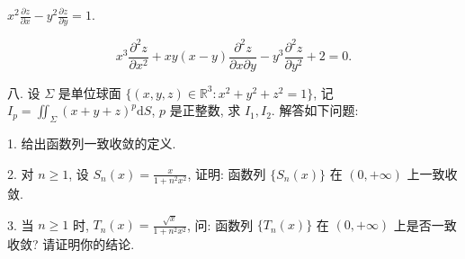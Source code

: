\documentclass{examcollection}
\renewcommand{\displayformula}[1]{\[#1\]}
\begin{document}
{\begin{minipage}{\textwidth}
$x^{2} \frac{\partial z}{\partial x} - y^{2} \frac{\partial z}{\partial y} = 1$.\par
\displayformula{x ^ {3} \frac {\partial^ {2} z}{\partial x ^ {2}} + x y (x - y) \frac {\partial^ {2} z}{\partial x \partial y} - y ^ {3} \frac {\partial^ {2} z}{\partial y ^ {2}} + 2 = 0.}\par
八. 设 $\Sigma$ 是单位球面 $\{(x, y, z) \in \mathbb{R}^3 : x^2 + y^2 + z^2 = 1\}$, 记 $I_p = \iint_{\Sigma} (x + y + z)^p \mathrm{d}S$, $p$ 是正整数, 求 $I_1, I_2$.
解答如下问题:\par
1. 给出函数列一致收敛的定义.\par
2. 对 $n \geq 1$, 设 $S_{n}(x) = \frac{x}{1 + n^{2}x^{2}}$, 证明: 函数列 $\{S_{n}(x)\}$ 在 $(0, +\infty)$ 上一致收敛.\par
3. 当 $n \geq 1$ 时, $T_{n}(x) = \frac{\sqrt{x}}{1 + n^{2}x^{2}}$, 问: 函数列 $\{T_{n}(x)\}$ 在 $(0, +\infty)$ 上是否一致收敛? 请证明你的结论.\par
\end{minipage}}
\ifdim\dimexpr\ht\proofbox+\dp\proofbox\relax>\textheight
\noindent\resizebox{!}{\textheight}{\usebox{\proofbox}}\else\noindent\usebox{\proofbox}\fi\clearpage
\end{document}
